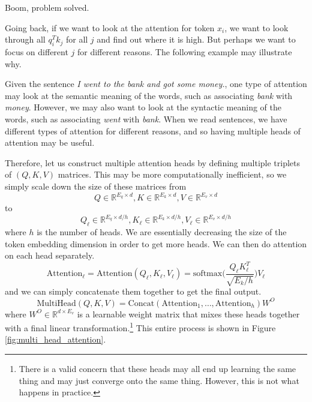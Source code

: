 \documentclass{article}
\begin{document}
      Boom, problem solved. 

      Going back, if we want to look at the attention for token $x_i$, we want to look through all $q_i^T k_j$ for all $j$ and find out where it is high. But perhaps we want to focus on different $j$ for different reasons. The following example may illustrate why. 

      \begin{example}
        Given the sentence \textit{I went to the bank and got some money.}, one type of attention may look at the semantic meaning of the words, such as associating \textit{bank} with \textit{money}. However, we may also want to look at the syntactic meaning of the words, such as associating \textit{went} with \textit{bank}. When we read sentences, we have different types of attention for different reasons, and so having multiple heads of attention may be useful. 
      \end{example}

      \begin{definition}
        Therefore, let us construct multiple attention heads by defining multiple triplets of $(Q, K, V)$ matrices. This may be more computationally inefficient, so we simply scale down the size of these matrices from 
        \[Q \in \mathbb{R}^{E_q \times d}, K \in \mathbb{R}^{E_k \times d}, V \in \mathbb{R}^{E_v \times d}\] 
        to 
        \[Q_\ell \in \mathbb{R}^{E_q \times d/h}, K_\ell \in \mathbb{R}^{E_k \times d/h}, V_\ell \in \mathbb{R}^{E_v \times d/h}\] 
        where $h$ is the number of heads. We are essentially decreasing the size of the token embedding dimension in order to get more heads. We can then do attention on each head separately. 
        \begin{equation} 
          \mathrm{Attention}_\ell = \mathrm{Attention}(Q_\ell, K_\ell, V_\ell) = \mathrm{softmax} \bigg( \frac{Q_\ell K_\ell^T}{\sqrt{E_k/h}} \bigg) V_\ell
        \end{equation}
        and we can simply concatenate them together to get the final output. 
        \[\mathrm{MultiHead}(Q, K, V) = \mathrm{Concat}(\mathrm{Attention}_1, \ldots, \mathrm{Attention}_h) W^O\]
        where $W^O \in \mathbb{R}^{d \times E_v}$ is a learnable weight matrix that mixes these heads together with a final linear transformation.\footnote{There is a valid concern that these heads may all end up learning the same thing and may just converge onto the same thing. However, this is not what happens in practice.} This entire process is shown in Figure \ref{fig:multi_head_attention}. 
      \end{definition}
\end{document}
